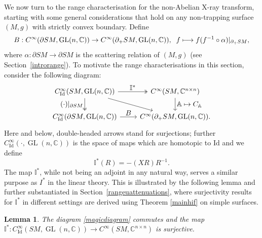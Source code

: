 \documentclass[JEP,XML,SOM,Unicode,published]{cedram}
\newcommand\mto{\mathchoice{\longmapsto}{\mapsto}{\mapsto}{\mapsto}}
\let\ts\textstyle
\DeclareMathOperator{\GL}{GL}
\theoremstyle{plain}
\newtheorem{lemma}[theorem]{Lemma}
\theoremstyle{definition}
\newcommand{\A}{\mathbb{A}}
\newcommand{\I}{\mathbb{I}}
\newcommand{\C}{\mathbb{C}}
\newcommand{\Id}{\mathrm{Id}}
\newcommand{\1}{{\bf 1}}
\begin{document}
We now turn to the range characterisation for the non-Abelian X-ray transform, starting with some general considerations that hold on any non-trapping surface $(M,g)$ with strictly convex boundary. Define
\begin{equation}\label{defB}
B:C^\infty(\partial SM,\GL(n,\C))\to C^\infty(\partial_+SM,\GL(n,\C)),\;\; f\mto f(f^{-1}\circ\alpha)\vert_{\partial_+SM},
\end{equation}
where $\alpha:\partial SM\to \partial SM$ is the scattering relation of $(M,g)$ (see Section~\ref{introrange}). To motivate the range characterisations in this section, consider the following diagram:
\begin{equation}\label{magicdiagram}
\begin{tikzcd}
C_\Id^\infty(SM,\GL(n,\C)) \arrow[swap, two heads]{d}{\ts(\cdot)\vert_{\partial SM}} \arrow{dr}\arrow[two heads]{r}{\ts\I^*} & C^\infty(SM,\C^{n\times n}) \arrow{d}{\ts\A\mto C_\A}\\
C_\Id^\infty(\partial SM,\GL(n,\C)) \arrow{r}{\ts B} & C^\infty(\partial_+SM,\GL(n,\C)).
\end{tikzcd}
\end{equation}
Here and below, double-headed arrows stand for surjections; further $C_\Id^\infty(\cdot,\GL(n,\C))$ is the space of maps which are homotopic to $\Id$ and we define \begin{equation*}
\I^*(R)=-(XR)R^{-1}.
\end{equation*}
The map $\I^*$, while not being an adjoint in any natural way, serves a similar purpose as $I^*$ in the linear theory. This is illustrated by the following lemma and further substantiated in Section~\ref{rangeuattenuations}, where surjectivity results for $\I^*$ in different settings are derived using Theorem \ref{mainhif} on simple surfaces.

\begin{lemma} The diagram \eqref{magicdiagram} commutes and the map $\I^*: C_\Id^\infty(SM,\GL(n,\C))\to C^\infty(SM,\C^{n\times n})$ is surjective.
\end{lemma}
\end{document}
